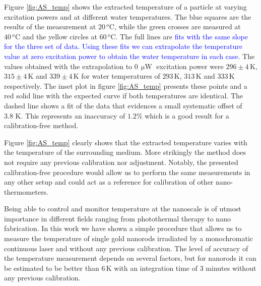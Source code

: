 \documentclass[journal=nalefd,manuscript=letter]{achemso}
\newcommand{\HI}[1]{\textcolor{blue}{#1}} %
\newcommand{\K}{\ensuremath{\,\textrm{K}}}
\newcommand{\uW}{\ensuremath{\,\upmu\textrm{W}}}
\newcommand{\degree}{\ensuremath{\,^o\textrm{C}}}
\begin{document}
Figure \ref{fig:AS_temp} shows the extracted temperature of a particle at
varying excitation powers and at different water temperatures. The blue squares
are the results of the measurement at $20\degree$, while the green crosses are measured
at $40\degree$ and the yellow circles at $60\degree$. The full lines are \HI{fits 
with the same slope for the three set of data. Using these fits we can extrapolate
the temperature value at zero excitation power to obtain the water temperature in each case.}
The values obtained with the extrapolation to $0\uW$ excitation power were $296 \pm 4\K$, $315\pm 4\K$
and $339 \pm 4\K$ for water temperatures of $293\K$, $313\K$ and $333\K$
respectively. The inset plot in figure \ref{fig:AS_temp} presents these points 
and a red solid line with the expected curve if both temperatures are identical. The 
dashed line shows a fit of the data that evidences a small systematic offset of $3.8\,\K$. This represents
an inaccuracy of $1.2\%$ which is a good result for a calibration-free method.

Figure \ref{fig:AS_temp} clearly shows that the extracted temperature varies
with the temperature of the surrounding medium. More strikingly the method does
not require any previous calibration nor adjustment. 
Notably, the presented calibration-free procedure would allow us to perform the same
measurements in any other setup and could act as a reference for calibration of
other nano-thermometers.


Being able to control and monitor temperature at the nanoscale is of utmost
importance in different fields ranging from photothermal therapy\cite{Huang2006}
to nano fabrication\cite{Fedoruk2013}. In this work we have shown a simple
procedure that allows us to measure the temperature of single gold nanorods
irradiated by a monochromatic continuous laser and without any previous
calibration. The level of accuracy of the temperature measurement depends on
several factors, but for nanorods it can be estimated to be better than $6\K$ 
with an integration time of $3$ minutes without any previous calibration.
\end{document}
